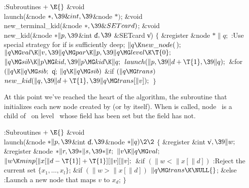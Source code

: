 \Y\B\4:Subroutines\X${}\mathrel+\E{}$\6
\&{void} \\{launch}(\&{node} ${}{*},\39\&{int},\39{}$\&{node} ${}{*}){}$;\6
\&{void} \\{new\_terminal\_kid}(\&{node} ${}{*},\39\&{SETcard}){}$;\7
\1\1\&{void} \\{new\_kid}(\&{node} ${}{*}\|p,\39{}$\&{int} \|d${},\39{}$%
\&{SETcard} \|v)\2\2\6
${}\{{}$\1\6
\&{register} \&{node} ${}{*}\|q;{}$\7
:Use special strategy for  if  is sufficiently
deep\X;\6
${}\|q\K\\{new\_node}(\,);{}$\6
${}\|q\MG\\{val}\K\|v,\39\|q\MG\\{par}\K\|p,\39\|q\MG\\{level}\K\T{0};{}$\6
${}\|q\MG\\{sib}\K\|p\MG\\{kid},\39\|p\MG\\{kid}\K\|q;{}$\6
${}\\{launch}(\|p,\39\|d+\T{1},\39\|q);{}$\6
\&{for} ${}(\|q\K\|q\MG\\{sib};{}$ \|q; ${}\|q\K\|q\MG\\{sib}){}$\1\6
\&{if} ${}(\|q\MG\\{trans}){}$\1\5
${}\\{new\_kid}(\|q,\39\|d+\T{1},\39\|q\MG\\{trans}[\|v]);{}$\2\2\6
\4${}\}{}$\2\par
\fi

At this point we've reached the heart of the algorithm, the 
subroutine that initializes each new node created by  (or by
 itself). When  is called, node~%
 is a child of~
on level~ whose  field has been set but the 
field has not.

\Y\B\4:Subroutines\X${}\mathrel+\E{}$\6
\1\1\&{void} \\{launch}(\&{node} ${}{*}\|p,\39{}$\&{int} \|d${},\39{}$\&{node}
${}{*}\|q)\2\2{}$\6
${}\{{}$\1\6
\&{register} \&{int} \|v${},\39\|w;{}$\6
\&{register} \&{node} ${}{*}\|r,\39{*}\|s,\39{*}\|t;{}$\7
${}\|v\K\|q\MG\\{val};{}$\6
${}\|w\K\\{minp}[\|x[\|d-\T{1}]+\T{1}][\|v][\|v];{}$\6
\&{if} ${}(\|w<\|x[\|d]){}$\1\5
:Reject the current set $\{x_1,\ldots,x_l\}$\X;\2\6
\&{if} ${}(\|w>\|x[\|d]){}$\1\5
${}\|q\MG\\{trans}\K\NULL{}$;\2\6
\&{else}\1\5
:Launch a new node that maps $v$ to $x_d$\X;\2\6
\4${}\}{}$\2\par
\fi

